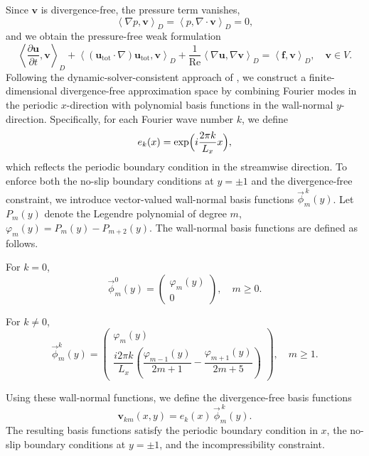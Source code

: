 \documentclass[a4paper,fleqn, 12pt]{cas-sc}
\numberwithin{table}{section}
\begin{document}
Since $\mathbf{v}$ is divergence-free, the pressure term vanishes,
\begin{equation}
	\left\langle \nabla p,\mathbf{v}\right\rangle_D
	=
	\left\langle p,\nabla\cdot\mathbf{v}\right\rangle_D
	=
	0,
	\label{eq:div}
\end{equation}
and we obtain the pressure-free weak formulation
\begin{equation}
	\left\langle \frac{\partial\mathbf{u}}{\partial t},\mathbf{v}\right\rangle _{D}
	+
	\left\langle (\mathbf{u}_{\mathrm{tot}}\cdot\nabla)\mathbf{u}_{\mathrm{tot}},\mathbf{v}\right\rangle _{D}
	+
	\frac{1}{\mathrm{Re}}\left\langle \nabla\mathbf{u},\nabla\mathbf{v}\right\rangle _{D}
	=
	\left\langle \mathbf{f},\mathbf{v}\right\rangle_D,
	\quad \mathbf{v}\in V.
	\label{eq:divNS}
\end{equation}
Following the dynamic-solver-consistent approach of   \cite{wan_dynamic_2017}, we construct a finite-dimensional divergence-free approximation space by combining Fourier modes in the periodic $x$-direction with polynomial basis functions in the wall-normal $y$-direction.
Specifically, for each Fourier wave number $k$, we define
\[
e_k(x)=\exp\Bigl(i\frac{2\pi k}{L_x}x\Bigr),
\]
which reflects the periodic boundary condition in the streamwise direction. 
To enforce both the no-slip boundary conditions at $y=\pm1$ and the divergence-free constraint, we introduce vector-valued wall-normal basis functions $\overrightarrow{\phi}^{\,k}_m(y)$.
Let $P_m(y)$ denote the Legendre polynomial of degree $m$,
$\varphi_m(y)= P_{m}(y)-P_{m+2}(y)$.
The wall-normal basis functions are defined as follows.

For $k=0$,
\begin{equation}
\overrightarrow{\phi}_{m}^{0}(y)
=
\begin{pmatrix}
\varphi_m(y) \\[1pt]
0
\end{pmatrix},
\quad m\ge 0.
\label{base-y-0}
\end{equation}

For $k\neq 0$,
\begin{equation}
\overrightarrow{\phi}_{m}^{k}(y)
=
\begin{pmatrix}
\varphi_m(y)\\[6pt]
\dfrac{i2\pi k}{L_x}\!\left(\dfrac{\varphi_{m-1}(y)}{2m+1}
-\dfrac{\varphi_{m+1}(y)}{2m+5}\right)
\end{pmatrix},
\quad m\ge 1.
\label{base-y-1}
\end{equation}

Using these wall-normal functions, we define the divergence-free basis functions
\[
\mathbf{v}_{km}(x,y)=e_k(x)\,\overrightarrow{\phi}^{\,k}_m(y).
\]
The resulting basis functions satisfy the periodic boundary condition in $x$, the no-slip boundary conditions at $y=\pm1$, and the incompressibility constraint.
\end{document}
